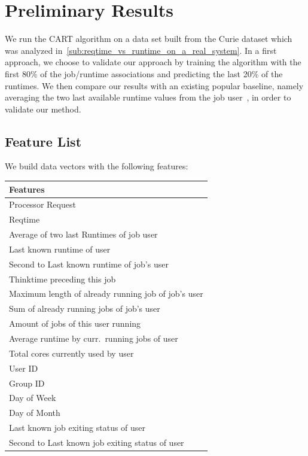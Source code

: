 \documentclass{article}
\begin{document}
\section{Preliminary Results}
\label{sec:preliminary_results}
We run the CART algorithm on a data set built from the Curie dataset which was analyzed in~\ref{sub:reqtime_vs_runtime_on_a_real_system}. In a first approach, we choose to validate our approach by training the algorithm with the first 80\% of the job/runtime associations and predicting the last 20\% of the runtimes. We then compare our results with an existing popular baseline, namely averaging the two last available runtime values from the job user~\cite{tsafir}, in order to validate our method.

\subsection{Feature List}
\label{sub:feature_list}
We build data vectors with the following features:

\begin{tabular}{|l|}
  \hline
  Features \\
  \hline
  Processor Request  \\
  Reqtime  \\
  Average of two last Runtimes of job user \\
  Last known runtime of user\\
  Second to Last known runtime of job's user \\
  Thinktime preceding this job \\
  Maximum length of already running job of job's user\\
  Sum of already running jobs of job's user\\
  Amount of jobs of this user running \\
  Average runtime by curr.\ running jobs of user\\
  Total cores currently used by user\\
  User ID \\
  Group ID\\
  Day of Week\\
  Day of Month\\
  Last known job exiting status of user\\
  Second to  Last known job exiting status of user\\

  \hline
\end{tabular}
\end{document}
